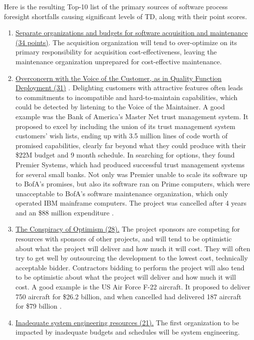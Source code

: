 Here is the resulting Top-10 list of the primary sources of software process foresight shortfalls causing significant levels of TD, along with their point scores.
\begin{enumerate}
	\item \ul{Separate organizations and budgets for software acquisition and maintenance (34 points)}.
	The acquisition organization will tend to over-optimize on its primary responsibility for acquisition cost-effectiveness, leaving the maintenance organization unprepared for cost-effective maintenance.
	\item \ul{Overconcern with the Voice of the Customer, as in Quality Function Deployment (31)} \citep{akao1994development}.
	Delighting customers with attractive features often leads to commitments to incompatible and hard-to-maintain capabilities, which could be detected by listening to the Voice of the Maintainer.
	A good example was the Bank of America's Master Net trust management system.
	It proposed to excel by including the union of its trust management system customers' wish lists, ending up with 3.5 million lines of code worth of promised capabilities, clearly far beyond what they could produce with their \$22M budget and 9 month schedule.
	In searching for options, they found Premier Systems, which had produced successful trust management systems for several small banks.
	Not only was Premier unable to scale its software up to BofA's promises, but also its software ran on Prime computers, which were unacceptable to BofA's software maintenance organization, which only operated IBM mainframe computers.
	The project was cancelled after 4 years and an \$88 million expenditure \citep{glass1997software}.
	\item \ul{The Conspiracy of Optimism (28).}
	The project sponsors are competing for resources with sponsors of other projects, and will tend to be optimistic about what the project will deliver and how much it will cost.
	They will often try to get well by outsourcing the development to the lowest cost, technically acceptable bidder.
	Contractors bidding to perform the project will also tend to be optimistic about what the project will deliver and how much it will cost.
	A good example is the US Air Force F-22 aircraft.
	It proposed to deliver 750 aircraft for \$26.2 billion, and when cancelled had delivered 187 aircraft for \$79 billion \citep{haffa2016learning}.
	\item \ul{Inadequate system engineering resources (21).}
	The first organization to be impacted by inadequate budgets and schedules will be system engineering.

\end{enumerate}
